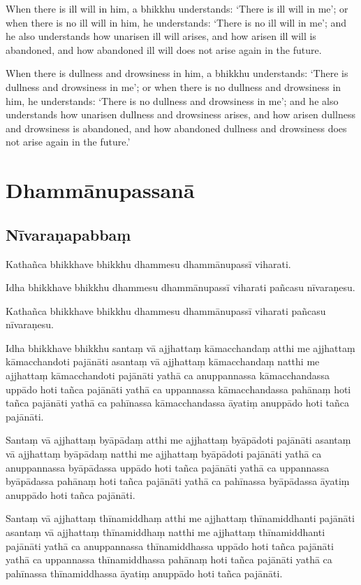 When there is ill will in him, a bhikkhu understands:
`There is ill will in me';
or when there is no ill will in him, he understands:
`There is no ill will in me';
and he also understands how unarisen ill will arises,
and how arisen ill will is abandoned,
and how abandoned ill will does not arise again in the future.

When there is dullness and drowsiness in him, a bhikkhu understands:
`There is dullness and drowsiness in me';
or when there is no dullness and drowsiness in him, he understands:
`There is no dullness and drowsiness in me';
and he also understands how unarisen dullness and drowsiness arises,
and how arisen dullness and drowsiness is abandoned, and
how abandoned dullness and drowsiness does not arise again in the future.'

\paliPage
\chapter*{Dhammānupassanā}

\section*{Nīvaraṇapabbaṃ}

Kathañca bhikkhave bhikkhu dhammesu dhammānupassī viharati.

Idha bhikkhave bhikkhu dhammesu dhammānupassī viharati pañcasu nīvaraṇesu.

Kathañca bhikkhave bhikkhu dhammesu dhammānupassī viharati pañcasu nīvaraṇesu.

Idha bhikkhave bhikkhu
santaṃ vā ajjhattaṃ kāmacchandaṃ atthi me ajjhattaṃ kāmacchandoti pajānāti
asantaṃ vā ajjhattaṃ kāmacchandaṃ natthi me ajjhattaṃ kāmacchandoti pajānāti
yathā ca anuppannassa kāmacchandassa uppādo hoti tañca pajānāti
yathā ca uppannassa kāmacchandassa pahānaṃ hoti tañca pajānāti
yathā ca pahīnassa kāmacchandassa āyatiṃ anuppādo hoti tañca pajānāti.

Santaṃ vā ajjhattaṃ byāpādaṃ atthi me ajjhattaṃ byāpādoti pajānāti
asantaṃ vā ajjhattaṃ byāpādaṃ natthi me ajjhattaṃ byāpādoti pajānāti
yathā ca anuppannassa byāpādassa uppādo hoti tañca pajānāti
yathā ca uppannassa byāpādassa pahānaṃ hoti tañca pajānāti
yathā ca pahīnassa byāpādassa āyatiṃ anuppādo hoti tañca pajānāti.

Santaṃ vā ajjhattaṃ thīnamiddhaṃ atthi me ajjhattaṃ thīnamiddhanti pajānāti
asantaṃ vā ajjhattaṃ thīnamiddhaṃ natthi me ajjhattaṃ thīnamiddhanti pajānāti
yathā ca anuppannassa thīnamiddhassa uppādo hoti tañca pajānāti
yathā ca uppannassa thīnamiddhassa pahānaṃ hoti tañca pajānāti
yathā ca pahīnassa thīnamiddhassa āyatiṃ anuppādo hoti tañca pajānāti.


